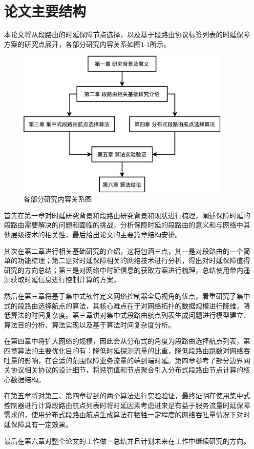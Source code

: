 \section{论文主要结构}

本论文将从段路由的时延保障节点选择，以及基于段路由协议标签列表的时延保障方案的研究点展开，各部分研究内容关系如图1-1所示。

\begin{figure}[htbp]
\setlength{\abovecaptionskip}{15pt plus 3pt minus 2pt}
\centerline{\includegraphics[width=0.95\textwidth]{./figures/ch1-research-relationship.png}}
\caption{各部分研究内容关系图}
\label{fig-ch1-research-relationship}
\end{figure}

首先在第一章对时延研究背景和段路由研究背景和现状进行梳理，阐述保障时延的段路由需要解决的问题和面临的挑战，分析保障时延的段路由的意义和与网络中其他层级技术的相关性，最后给出论文的主要篇章结构安排。

其次在第二章进行相关基础研究的介绍，这将包涵三点，其一是对段路由的一个简单的功能梳理；第二是对时延保障相关的网络技术进行分析，得出对时延保障值得研究的方向总结；第三是对网络中时延信息的获取方案进行梳理，总结使用带内遥测获取时延信息进行控制计算的方案。

然后在第三章将基于集中式软件定义网络控制器全局视角的优点，着重研究了集中式的段路由选择航点的算法，其核心难点在于对网络拓扑的数据规模进行降维，降低算法的时间复杂度。第三章讲对集中式段路由航点列表生成问题进行模型建立、算法目的分析、算法实现以及基于算法时间复杂度分析。

在第四章中将扩大网络的规模，因此会从分布式的角度为段路由选择航点列表，第四章算法的主要优化目的有：降低时延探测流量的比重，降低段路由跳数对网络吞吐量的影响，在合适的范围保障业务流量的端到端时延。第四章参考了部分边界网关协议相关协议的设计细节，将惩罚值和节点聚合引入分布式段路由节点计算的核心数据结构。

在第五章将对第三、第四章提到的两个算法进行实验验证，最终证明在使用集中式控制器进行计算段路由航点列表时将时延因素考虑进来是有益于服务流量时延保障需求的，使用分布式段路由航点生成算法在牺牲一定程度的网络吞吐量情况下对时延保障具有一定效果。

最后在第六章对整个论文的工作做一总结并且计划未来在工作中继续研究的方向。

\ifx\usechapbib\empty
\nocite{BSTcontrol}
\setcounter{NAT@ctr}{0}


\fi
